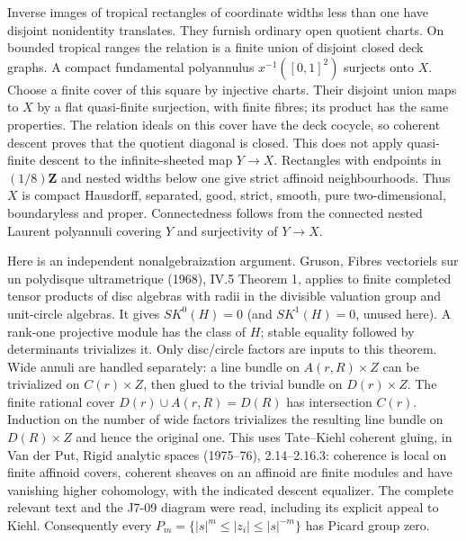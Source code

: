 \documentclass[11pt]{article}
\begin{document}
Inverse images of tropical rectangles of coordinate widths less than one have disjoint nonidentity translates. They furnish ordinary open quotient charts. On bounded tropical ranges the relation is a finite union of disjoint closed deck graphs. A compact fundamental polyannulus $x^{-1}([0,1]^2)$ surjects onto $X$. Choose a finite cover of this square by injective charts. Their disjoint union maps to $X$ by a flat quasi-finite surjection, with finite fibres; its product has the same properties. The relation ideals on this cover have the deck cocycle, so coherent descent proves that the quotient diagonal is closed. This does not apply quasi-finite descent to the infinite-sheeted map $Y\to X$. Rectangles with endpoints in $(1/8)\mathbf Z$ and nested widths below one give strict affinoid neighbourhoods. Thus $X$ is compact Hausdorff, separated, good, strict, smooth, pure two-dimensional, boundaryless and proper. Connectedness follows from the connected nested Laurent polyannuli covering $Y$ and surjectivity of $Y\to X$.

Here is an independent nonalgebraization argument. Gruson, Fibres vectoriels sur un polydisque ultrametrique (1968), IV.5 Theorem 1, applies to finite completed tensor products of disc algebras with radii in the divisible valuation group and unit-circle algebras. It gives $SK^0(H)=0$ (and $SK^1(H)=0$, unused here). A rank-one projective module has the class of $H$; stable equality followed by determinants trivializes it. Only disc/circle factors are inputs to this theorem. Wide annuli are handled separately: a line bundle on $A(r,R)\times Z$ can be trivialized on $C(r)\times Z$, then glued to the trivial bundle on $D(r)\times Z$. The finite rational cover $D(r)\cup A(r,R)=D(R)$ has intersection $C(r)$. Induction on the number of wide factors trivializes the resulting line bundle on $D(R)\times Z$ and hence the original one. This uses Tate--Kiehl coherent gluing, in Van der Put, Rigid analytic spaces (1975--76), 2.14--2.16.3: coherence is local on finite affinoid covers, coherent sheaves on an affinoid are finite modules and have vanishing higher cohomology, with the indicated descent equalizer. The complete relevant text and the J7-09 diagram were read, including its explicit appeal to Kiehl. Consequently every $P_m=\{|s|^m\le |z_i|\le |s|^{-m}\}$ has Picard group zero.
\end{document}
